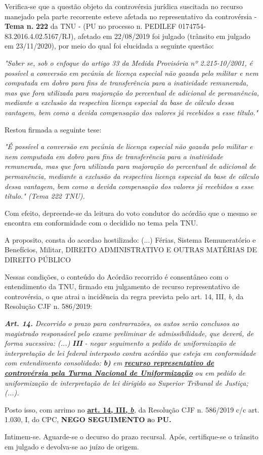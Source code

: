 \documentclass[12pt]{article}
\begin{document}
\justifying
\noindent Verifica-se que a questão objeto da controvérsia jurídica suscitada no recurso manejado pela parte recorrente esteve afetada no representativo da controvérsia - \textbf{Tema n. }\textbf{222} da TNU - (PU no processo n. PEDILEF 0174754-83.2016.4.02.5167/RJ),  afetado em 22/08/2019 foi julgado (trânsito em julgado em 23/11/2020), por meio do qual foi elucidada a seguinte questão:

\noindent \textit{"Saber se, sob o enfoque do artigo 33 da Medida Provisória nº 2.215-10/2001, é possível a conversão em pecúnia de licença especial não gozada pelo militar e nem computada em dobro para fins de transferência para a inatividade remunerada, mas que fora utilizada para majoração do percentual de adicional de permanência, mediante a exclusão da respectiva licença especial da base de cálculo dessa vantagem, bem como a devida compensação dos valores já recebidos a esse título."}

\noindent Restou firmada a seguinte tese:

\noindent \textit{"É possível a conversão em pecúnia de licença especial não gozada pelo militar e nem computada em dobro para fins de transferência para a inatividade remunerada, mas que fora utilizada para majoração do percentual de adicional de permanência, mediante a exclusão da respectiva licença especial da base de cálculo dessa vantagem, bem como a devida compensação dos valores já recebidos a esse título." (Tema 222 TNU).}

\noindent Com efeito, depreende-se da leitura do voto condutor do acórdão que o mesmo se encontra em conformidade com o decidido no  tema pela TNU.

\noindent A proposito, consta do acordao hostilizado: (...) Férias, Sistema Remuneratório e Benefícios, Militar, DIREITO ADMINISTRATIVO E OUTRAS MATÉRIAS DE DIREITO PÚBLICO

\noindent Nessas condições, o conteúdo do Acórdão recorrido é consentâneo com o entendimento da TNU, firmado em julgamento de recurso representativo de controvérsia, o que atrai a incidência da regra prevista pelo art. 14, III, \textit{b,} da Resolução CJF n. 586/2019:

\noindent \textit{\textbf{Art. 14.}}\textit{ Decorrido o prazo para contrarrazões, os autos serão conclusos ao magistrado responsável pelo exame preliminar de admissibilidade, que deverá, de forma sucessiva: (...) }\textit{\textbf{III }}\textit{- negar seguimento a pedido de uniformização de interpretação de lei federal interposto contra acórdão que esteja em conformidade com entendimento consolidado: }\textit{\textbf{b)}}\textit{ em }\uline{\textit{\textbf{recurso representativo de controvérsia pela Turma Nacional de Uniformização}}}\textit{ ou em pedido de uniformização de interpretação de lei dirigido ao Superior Tribunal de Justiça;(...).}

\noindent Posto isso, com arrimo no \uline{\textbf{art. 14, III, }}\uline{\textit{\textbf{b}}}\textit{,} da Resolução CJF n. 586/2019 c/c art. 1.030, I, do CPC, \textbf{NEGO SEGUIMENTO }\textbf{a}o\textbf{ PU}\textbf{.}

\noindent Intimem-se. Aguarde-se o decurso do prazo recursal. Após, certifique-se o trânsito em julgado e devolva-se ao juízo de origem.
\end{document}
